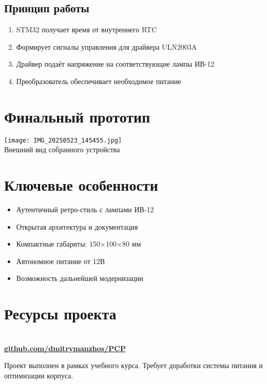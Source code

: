 \documentclass[a3paper,landscape]{article}
\begin{document}
\begin{multicols}{2}
\subsection*{Принцип работы}
\begin{enumerate}[leftmargin=*,itemsep=0.5ex,topsep=0.5ex]
    \item STM32 получает время от внутреннего RTC
    \item Формирует сигналы управления для драйвера ULN2003A
    \item Драйвер подаёт напряжение на соответствующие лампы ИВ-12
    \item Преобразователь обеспечивает необходимое питание
\end{enumerate}

\columnbreak

\section*{Финальный прототип}
\begin{center}
\texttt{[image: IMG\_20250523\_145455.jpg]} \\
\vspace{0.3cm}
{\small Внешний вид собранного устройства}
\end{center}

\section*{Ключевые особенности}
\begin{itemize}[leftmargin=*,itemsep=0.5ex,topsep=0.5ex]
    \item Аутентичный ретро-стиль с лампами ИВ-12
    \item Открытая архитектура и документация
    \item Компактные габариты: 150×100×80 мм
    \item Автономное питание от 12В
    \item Возможность дальнейшей модернизации
\end{itemize}

\section*{Ресурсы проекта}
\begin{center}
 \\
\vspace{0.5cm}
\href{https://github.com/dmitrymanzhos/PCP}{\color{accent}\textbf{github.com/dmitrymanzhos/PCP}}
\end{center}

\end{multicols}

\vspace{0.8cm}
\begin{center}
\footnotesize Проект выполнен в рамках учебного курса. Требует доработки системы питания и оптимизации корпуса.
\end{center}
\end{document}

